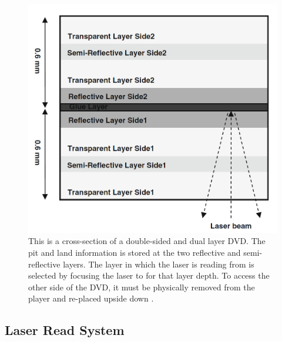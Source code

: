 \documentclass[ notitlepage, numerical, 11pt]{revtex4-1} %
\begin{document}
\begin{figure}[H]
\centerline{\includegraphics[scale=.5]{DVD.png}}
\caption{This is a cross-section of a double-sided and dual layer DVD. The pit and land information is stored at the two reflective and semi-reflective layers. The layer in which the laser is reading from is selected by focusing the laser to for that layer depth. To access the other side of the DVD, it must be physically removed from the player and re-placed upside down \cite{memory}.}
\label{DVD}
\end{figure} 


\subsection{Laser Read System}
\end{document}
